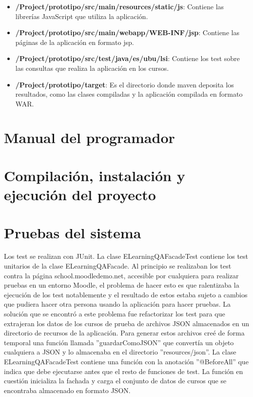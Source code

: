 \begin{itemize}
	\item \textbf{/Project/prototipo/src/main/resources/static/js}: Contiene las librerías JavaScript que utiliza la aplicación.
	\item \textbf{/Project/prototipo/src/main/webapp/WEB-INF/jsp}: Contiene las páginas de la aplicación en formato jsp.
	\item \textbf{/Project/prototipo/src/test/java/es/ubu/lsi}: Contiene los test sobre las consultas que realiza la aplicación en los cursos.
	\item \textbf{/Project/prototipo/target}: Es el directorio donde maven deposita los resultados, como las clases compiladas y la aplicación compilada en formato WAR.
	
\end{itemize}
\section{Manual del programador}

\section{Compilación, instalación y ejecución del proyecto}

\section{Pruebas del sistema}
Los test se realizan con JUnit.
La clase ELearningQAFacadeTest contiene los test unitarios de la clase ELearningQAFacade. Al principio se realizaban los test contra la página school.moodledemo.net, accesible por cualquiera para realizar pruebas en un entorno Moodle, el problema de hacer esto es que ralentizaba la ejecución de los test notablemente y el resultado de estos estaba sujeto a cambios que pudiera hacer otra persona usando la aplicación para hacer pruebas.
La solución que se encontró a este problema fue refactorizar los test para que extrajeran los datos de los cursos de prueba de archivos JSON almacenados en un directorio de recursos de la aplicación. Para generar estos archivos creé de forma temporal una función llamada ''guardarComoJSON'' que convertía un objeto cualquiera a JSON y lo almacenaba en el directorio ''resources/json''.
La clase ELearningQAFacadeTest contiene una función con la anotación ''@BeforeAll'' que indica que debe ejecutarse antes que el resto de funciones de test. La función en cuestión inicializa la fachada y carga el conjunto de datos de cursos que se encontraba almacenado en formato JSON.